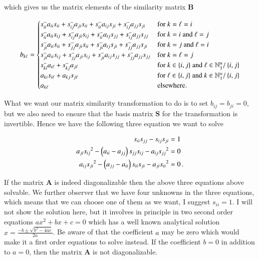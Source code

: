 \documentclass[11pt,english,a4paper]{article}
\begin{document}
\begin{flushleft}
which gives us the matrix elements of the similarity matrix $\mathbf{B}$

\begin{align}
b_{k\ell} = \begin{cases} s_{ii}^- a_{ii} s_{ii} + s_{ij}^- a_{ji} s_{ii} + s_{ii}^- a_{ij} s_{ji} + s_{ij}^- a_{jj} s_{ji} & \text{for $k=\ell=i$} \\ s_{ii}^- a_{ii} s_{ij} + s_{ij}^- a_{ji} s_{ij} + s_{ii}^- a_{ij} s_{jj} + s_{ij}^- a_{jj} s_{jj} & \text{for $k=i$ and $\ell = j$} \\ s_{ji}^- a_{ii} s_{ii} + s_{jj}^- a_{ji} s_{ii} + s_{ji}^- a_{ij} s_{ji} + s_{jj}^- a_{jj} s_{ji} & \text{for $k=j$ and $\ell=i$} \\ s_{ji}^- a_{ii} s_{ij} + s_{jj}^- a_{ji} s_{ij} + s_{ji}^- a_{ij} s_{jj} + s_{jj}^- a_{jj} s_{jj} & \text{for $k=\ell=j$} \\ s_{ki}^- a_{i \ell} + s_{kj}^- a_{j\ell} & \text{for $k\in\left\lbrace{i,j}\right\rbrace$ and $\ell\in\mathbb{N}_1^n / \left\lbrace{i,j}\right\rbrace$} \\ a_{ki} s_{i\ell} + a_{kj}s_{j\ell} & \text{for $\ell\in\left\lbrace{i,j}\right\rbrace$ and $k\in\mathbb{N}_1^n / \left\lbrace{i,j}\right\rbrace$} \\ a_{k\ell} & \text{elsewhere.}\end{cases}
\label{eq_2}
\end{align}

What we want our matrix similarity transformation to do is to set $b_{ij} = b_{ji} = 0$, but we also need to ensure that the basis matrix $\mathbf{S}$ for the transformation is invertible. Hence we have the following three equation we want to solve 

\begin{align}
s_{ii} s_{jj} - s_{ij} s_{ji} &= 1 
\label{eq_3}\\
a_{ji} {s_{ij}}^2-\left({a_{ii}-a_{jj}}\right)s_{jj}s_{ij} - a_{ij}{s_{jj}}^2 &= 0 \label{eq_4}\\
a_{ij} {s_{ji}}^2 - \left({a_{jj}-a_{ii}}\right)s_{ii}s_{ji} - a_{ji}{s_{ii}}^2 &= 0 \,. \label{eq_5}
\end{align} 

If the matrix $\mathbf{A}$ is indeed diagonalizable then the above three equations above solvable. We further observer that we have four unknowns in the three equations, which means that we can choose one of them as we want, I suggest $s_{ii}=1$. I will not show the solution here, but it involves in principle in two second order equations $a x^2 + b x + c = 0$ which has a well known analytical solution $x = \frac{-b\pm\sqrt{b^2 - 4ac}}{2a}$. Be aware of that the coefficient $a$ may be zero which would make it a first order equations to solve instead. If the coefficient $b=0$ in addition to $a=0$, then the matrix $\mathbf{A}$ is not diagonalizable. \linebreak


\end{flushleft}
\end{document}
